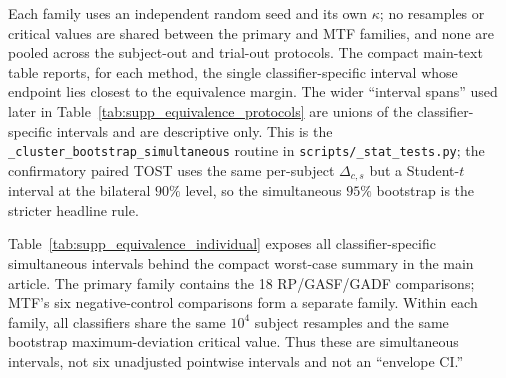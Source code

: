 \documentclass[10pt,a4paper,parskip=half-]{scrartcl}
\begin{document}
Each family uses an independent random seed and its own $\kappa$; no resamples or critical values are shared between the primary and MTF families, and none are pooled across the subject-out and trial-out protocols. The compact main-text table reports, for each method, the single classifier-specific interval whose endpoint lies closest to the equivalence margin. The wider ``interval spans'' used later in Table~\ref{tab:supp_equivalence_protocols} are unions of the classifier-specific intervals and are descriptive only. This is the \texttt{\_cluster\_bootstrap\_simultaneous} routine in \texttt{scripts/\_stat\_tests.py}; the confirmatory paired TOST uses the same per-subject $\Delta_{c,s}$ but a Student-$t$ interval at the bilateral $90\%$ level, so the simultaneous $95\%$ bootstrap is the stricter headline rule.

Table~\ref{tab:supp_equivalence_individual} exposes all classifier-specific simultaneous intervals behind the compact worst-case summary in the main article. The primary family contains the 18 RP/GASF/GADF comparisons; MTF's six negative-control comparisons form a separate family. Within each family, all classifiers share the same $10^4$ subject resamples and the same bootstrap maximum-deviation critical value. Thus these are simultaneous intervals, not six unadjusted pointwise intervals and not an ``envelope CI.''

\begin{table}[H]
\centering
\caption{Mean per-subject $\Delta$accuracy and simultaneous 95\% interval, Original $-$ reconstruction, under grouped subject-out validation (51 subjects). Bold cells lie wholly inside $[-0.01,+0.01]$.}
\label{tab:supp_equivalence_individual}
\footnotesize
\setlength{\tabcolsep}{3pt}
\end{table}
\end{document}
